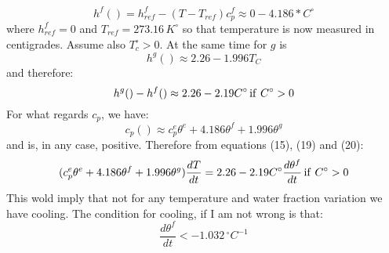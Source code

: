 \begin{equation}
h^f() = h^f_{ref} -(T-T_{ref})c_p^f \approx 0 - 4.186*  C^\circ   
\end{equation}
where \(h_{ref}^f=0\) and \(T_{ref} = 273.16\, K^\circ\) so that temperature is now measured in centigrades. Assume also \(T_c^\circ >0 \).
At the same time for \(g\) is 
\begin{equation}
h^g( ) \approx 2.26  - 1.996 T_C
\end{equation}
and therefore:
\begin{equation}
h^g()-h^f() \approx 2.26 - 2.19 C^\circ \, {\rm if}\ C^\circ > 0
\end{equation}
For what regards \( c_p\), we have:
\begin{equation}
c_p() \approx c_p^e \theta^e + 4.186 \theta^f + 1.996 \theta^g
\end{equation}
and is, in any case, positive.
Therefore from equations (15), (19) and (20):
\begin{equation}
(c_p^e \theta^e + 4.186 \theta^f + 1.996 \theta^g) \frac{dT}{dt} = 2.26 - 2.19 C^\circ \frac{d\theta^f}{dt}\, {\rm if}\ C^\circ > 0
\end{equation}
This wold imply that not for any temperature and water fraction variation we have cooling. The condition for cooling, if I am not wrong is that:
\begin{equation}
\frac{d\theta^f}{dt} < - 1.032\,  ^\circ C^{-1} 
\end{equation}